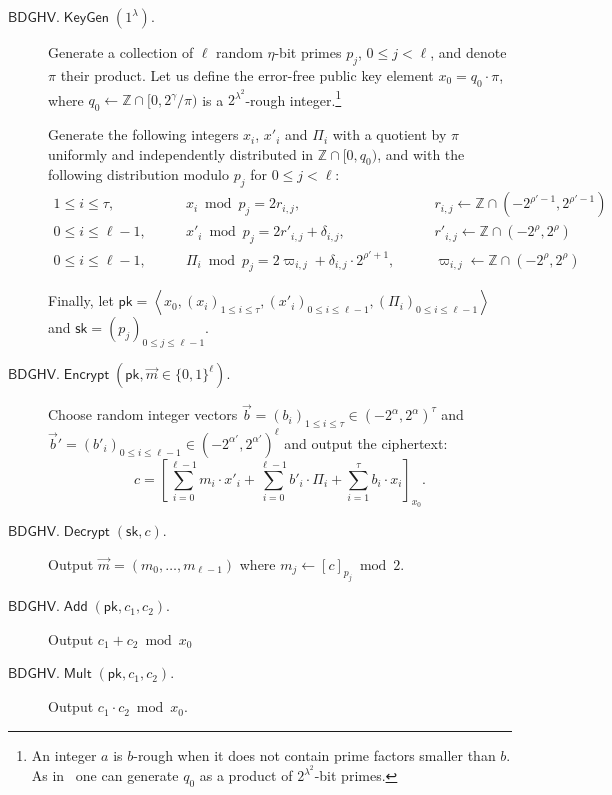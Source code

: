 \documentclass[11pt]{llncs}
\renewcommand\leq\leqslant
\newcommand{\Z}{{\mathbb Z}}
\DeclareMathOperator{\KeyGen}{\ensuremath{\mathsf{KeyGen}}}
\DeclareMathOperator{\Encrypt}{\ensuremath{\mathsf{Encrypt}}}
\DeclareMathOperator{\Decrypt}{\ensuremath{\mathsf{Decrypt}}}
\DeclareMathOperator{\Add}{\ensuremath{\mathsf{Add}}}
\DeclareMathOperator{\Mult}{\ensuremath{\mathsf{Mult}}}
\newcommand*{\pk}{\ensuremath{\mathsf{pk}}}
\newcommand*{\sk}{\ensuremath{\mathsf{sk}}}
\newcommand*{\BDGHV}{\ensuremath{\mathsf{BDGHV}}}
\begin{document}
\begin{description}
\item[$\BDGHV.\KeyGen(1^\lambda)$.] Generate a collection of $\ell$
random $\eta$-bit primes $p_j$, $0\leq j<\ell$, and denote $\pi$
their product. Let us define the error-free public key element
$x_0=q_0\cdot\pi$, where $q_0 \leftarrow \Z \cap [0,2^{\gamma}/\pi)$
  is a $2^{\lambda^2}$-rough integer.\footnote{An integer $a$ is $b$-rough when it does
    not contain prime factors smaller than $b$. As in~\cite{CMNT2011} one can
    generate $q_0$ as a product of $2^{\lambda^2}$-bit primes.}  

  Generate the following integers $x_i$, $x'_i$ and $\varPi_i$ with a quotient by $\pi$ uniformly
  and independently distributed in $\Z\cap [0, q_0)$, and with the
    following distribution modulo $p_j$ for $0 \leq j < \ell$:
$$
\begin{array}{lll}
1 \leq i \leq \tau, & \qquad x_i\bmod p_j = 2r_{i,j},& \qquad r_{i,j}
\leftarrow\Z\cap(-2^{\rho'-1}, 2^{\rho'-1}) \\[.2cm]

0\leq i\leq \ell-1, & \qquad x'_i\bmod p_j = 2r'_{i,j}+\delta_{i,j}, &
\qquad r'_{i,j}\leftarrow\Z\cap(-2^{\rho}, 2^{\rho}) \\[.2cm]

0\leq i\leq \ell-1, & \qquad \varPi_i \bmod p_j = 2\varpi_{i,j} +
\delta_{i,j}\cdot 2^{\rho'+1}, &
\qquad \varpi_{i,j}\leftarrow\Z\cap(-2^{\rho}, 2^{\rho})
\end{array}
$$

Finally, let $\pk = \left\langle x_0, \left(x_i\right)_{1\leq i\leq \tau}, \left(x'_i\right)_{0\leq i\leq \ell-1}, \left(\varPi_i\right)_{0\leq i\leq {\ell-1}}\right\rangle$ and $\sk=(p_j)_{0\leq j\leq {\ell-1}}$.

\item[$\BDGHV.\Encrypt(\pk, \vec{m} \in \{0,1\}^\ell)$.] Choose 
  random integer vectors $\vec b=(b_i)_{1\leq i\leq \tau}
  \in(-2^\alpha,2^{\alpha})^\tau$ and $\vec b'=(b'_i)_{0\leq i\leq
      \ell-1} \in(-2^{\alpha'},2^{\alpha'})^{\ell}$ 
and output the ciphertext:
\begin{equation}
\label{eq:encbdghv}
c = \left[\sum\limits_{i=0}^{\ell-1} m_i \cdot x'_i + 
	\sum_{i=0}^{\ell-1} b'_i\cdot \varPi_i  + \sum_{i=1}^\tau 
b_i\cdot x_i\right]_{x_0}.
\end{equation}
\item[$\BDGHV.\Decrypt(\sk, c)$.] Output $\vec{m}=(m_0,\ldots,m_{\ell-1})$ where $m_j \leftarrow [c]_{p_j} \bmod 2$.
\\\vspace{-0.25cm}
\item[$\BDGHV.\Add(\pk, c_1, c_2)$.] Output $c_1+c_2 \bmod x_0$
\\\vspace{-0.25cm}
\item[$\BDGHV.\Mult(\pk, c_1, c_2)$.] Output $c_1 \cdot c_2 \bmod x_0$.
\end{description}
\end{document}
